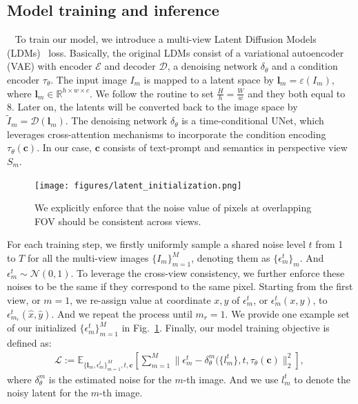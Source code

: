 \subsection{Model training and inference}~\label{sec:model_train}
To train our model, we introduce a multi-view Latent Diffusion Models (LDMs)~\cite{rombach2021highresolution} loss. Basically, the original LDMs consist of a variational autoencoder (VAE) with encoder $\mathcal{E}$ and decoder $\mathcal{D}$, a denoising network $\delta_{\theta}$ and a condition encoder $\tau_{\theta}$. The input image $I_m$ is mapped to a latent space by $\mathbf{l}_m=\varepsilon(I_m)$, where $\mathbf{l}_m\in\mathbb{R}^{h\times w\times c}$. We follow the routine to set $\frac{H}{h}=\frac{W}{w}$ and they both equal to 8. Later on, the latents will be converted back to the image space by $\tilde{I}_m=\mathcal{D}(\mathbf{l}_m)$. The denoising network $\delta_{\theta}$ is a time-conditional UNet, which leverages cross-attention mechanisms to incorporate the condition encoding $\tau_{\theta}(\mathbf{c})$. In our case, $\mathbf{c}$ consists of text-prompt and semantics in perspective view $S_m$. 

\begin{figure}[t]
\centering
\texttt{[image: figures/latent\_initialization.png]}
\caption{We explicitly enforce that the noise value of pixels at overlapping FOV should be consistent across views. 
}
\label{fig:noise_init}
\end{figure}

For each training step, we firstly uniformly sample a shared noise level $t$ from 1 to $T$ for all the multi-view images $\{I_m\}_{m=1}^M$, denoting them as $\{\epsilon^t_m\}_m$. And $\epsilon^t_m\sim\mathcal{N}(0,1)$. To leverage the cross-view consistency, we further enforce these noises to be the same if they correspond to the same pixel. Starting from the first view, or $m=1$, we re-assign value at coordinate $x,y$ of $\epsilon^t_m$, or $\epsilon^t_m(x,y)$, to $\epsilon^t_{m_r}(\hat{x},\hat{y})$. And we repeat the process until $m_r=1$. We provide one example set of our initialized $\{\epsilon^t_m\}_{m=1}^M$ in Fig.~\ref{fig:noise_init}. Finally, our model training objective is defined as:
\begin{equation}
\begin{aligned} 
 \mathcal{L}:=\mathbb{E}_{\{\mathbf{l}_m,\epsilon^t_m\}_{m=1}^M,t,\mathbf{c}}\left[\sum_{m=1}^M\|\epsilon^t_m-\delta_{\theta}^m(\{l_m^t\},t,\tau_{\theta}(\mathbf{c})\|_2^2\right],
 \end{aligned}~\label{equ:loss}
\end{equation}
where $\delta_{\theta}^m$ is the estimated noise for the $m$-th image. And we use $l_m^t$ to denote the noisy latent for the $m$-th image. 

